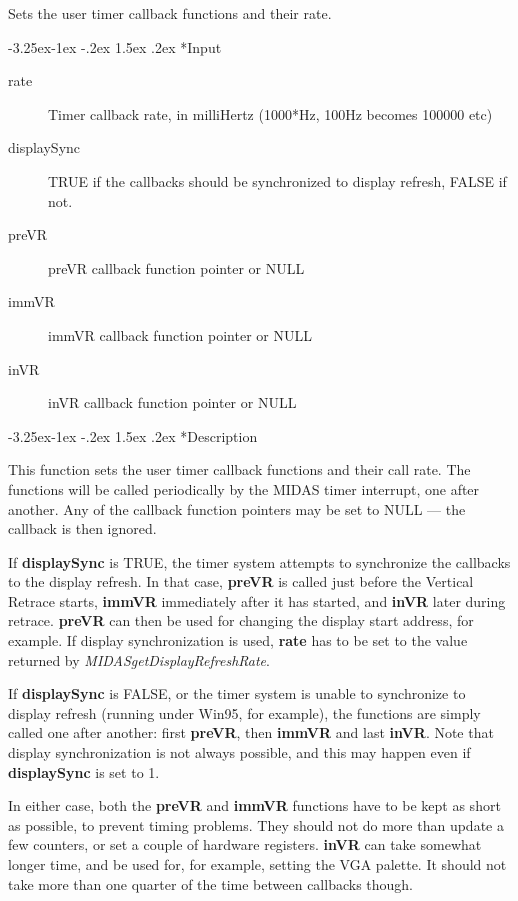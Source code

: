 \documentclass[a4paper,12pt,oneside]{book}
\makeatletter
\renewcommand\subsubsection{\@startsection{subsubsection}{3}{-20pt}%
                                     {-3.25ex\@plus -1ex \@minus -.2ex}%
                                     {1.5ex \@plus .2ex}%
                                     {\normalfont\normalsize\bfseries}}
\newcommand{\mVariable}[1]{{\bf #1}}
\newcommand{\mDocRef}[1]{{\em #1}}
\newcommand{\mDocRef}[1]{\hyperref{#1}{hum}{hum}{#1}}
\makeatother
\begin{document}
Sets the user timer callback functions and their rate.

\subsubsection*{Input}

\begin{description}
    \item [rate] Timer callback rate, in milliHertz (1000*Hz, 100Hz
        becomes 100000 etc)
    \item [displaySync] TRUE if the callbacks should be synchronized to
        display refresh, FALSE if not.
    \item [preVR] preVR callback function pointer or NULL
    \item [immVR] immVR callback function pointer or NULL
    \item [inVR] inVR callback function pointer or NULL
\end{description}


\subsubsection*{Description}

This function sets the user timer callback functions and their call
rate. The functions will be called periodically by the MIDAS timer
interrupt, one after another. Any of the callback function pointers may
be set to NULL --- the callback is then ignored.

If \mVariable{displaySync} is TRUE, the timer system attempts to
synchronize the callbacks to the display refresh. In that case,
\mVariable{preVR} is called just before the Vertical Retrace starts,
\mVariable{immVR} immediately after it has started, and \mVariable{inVR}
later during retrace. \mVariable{preVR} can then be used for changing
the display start address, for example. If display synchronization is
used, \mVariable{rate} has to be set to the value returned by
\mDocRef{MIDASgetDisplayRefreshRate}.

If \mVariable{displaySync} is FALSE, or the timer system is unable to
synchronize to display refresh (running under Win95, for example), the
functions are simply called one after another: first \mVariable{preVR},
then \mVariable{immVR} and last \mVariable{inVR}. Note that display
synchronization is not always possible, and this may happen even if
\mVariable{displaySync} is set to 1. 

In either case, both the \mVariable{preVR} and \mVariable{immVR}
functions have to be kept as short as possible, to prevent timing
problems. They should not do more than update a few counters, or set a
couple of hardware registers. \mVariable{inVR} can take somewhat longer
time, and be used for, for example, setting the VGA palette. It should
not take more than one quarter of the time between callbacks though.
\end{document}
